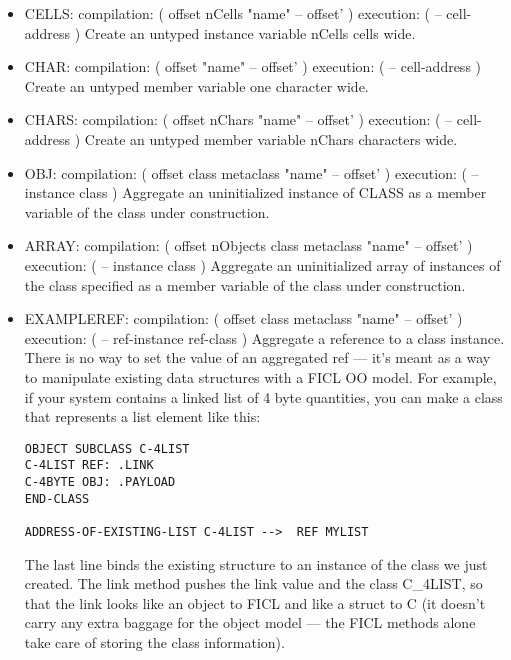 \begin{;stlisting}[frame=single]
\begin{itemize}[noitemsep]
	\item CELLS: compilation: ( offset nCells "name" -- offset' )
		execution: ( -- cell-address )\newline
	Create an untyped instance variable nCells cells wide.

	\item CHAR: compilation: ( offset "name" -- offset' )
		execution: ( -- cell-address )\newline
	Create an untyped member variable one character wide.

	\item CHARS: compilation: ( offset nChars "name" -- offset' )
		execution: ( -- cell-address )\newline
	Create an untyped member variable nChars characters wide.

	\item OBJ: compilation: ( offset class metaclass "name" --
		offset' ) execution: ( -- instance class )\newline
	Aggregate an uninitialized instance of CLASS as a member
	variable of the class under construction.

	\item ARRAY: compilation: ( offset nObjects class metaclass
		"name" -- offset' ) execution: ( -- instance class )\newline
	Aggregate an uninitialized array of instances of the class
	specified as a member variable of the class under construction.

	\item EXAMPLEREF: compilation: ( offset class metaclass
		"name" -- offset' ) execution: ( -- ref-instance
		ref-class )\newline
	Aggregate a reference to a class instance. There is no way to
	set the value of an aggregated ref — it's meant as a way to
	manipulate existing data structures with a FICL OO model. For
	example, if your system contains a linked list of 4 byte
	quantities, you can make a class that represents a list element
	like this:
\begin{lstlisting}[frame=single]
OBJECT SUBCLASS C-4LIST
C-4LIST REF: .LINK
C-4BYTE OBJ: .PAYLOAD
END-CLASS

ADDRESS-OF-EXISTING-LIST C-4LIST -->  REF MYLIST
\end{lstlisting}
	The last line binds the existing structure to an instance of the
	class we just created. The link method pushes the link value and
	the class C\_4LIST, so that the link looks like an object to
	FICL and like a struct to C (it doesn't carry any extra baggage
	for the object model — the FICL methods alone take care of
	storing the class information).


\end{itemize}
\end{;stlisting}

